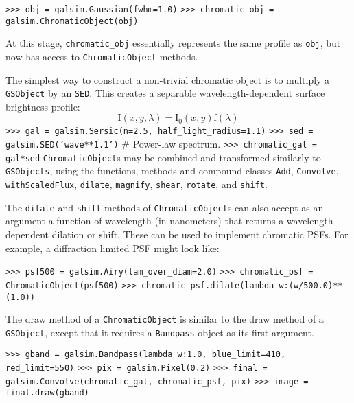 \documentclass[preprint,11pt]{../../devel/modules/aastex}
\begin{document}
{\tt >>> obj = galsim.Gaussian(fwhm=1.0)}\newline
{\tt >>> chromatic\_obj = galsim.ChromaticObject(obj)}

At this stage, \texttt{chromatic\_obj} essentially represents the same profile as \texttt{obj}, but
now has access to \texttt{ChromaticObject} methods.

The simplest way to construct a non-trivial chromatic object is to multiply a \texttt{GSObject} by
an \texttt{SED}.  This creates a separable wavelength-dependent surface brightness profile:
\begin{equation}
  \mathrm{I}(x, y, \lambda) = \mathrm{I}_0(x, y) \mathrm{f}(\lambda)
\end{equation}
\newline
{\tt >>> gal = galsim.Sersic(n=2.5, half\_light\_radius=1.1)}\newline
{\tt >>> sed = galsim.SED('wave**1.1')} \# Power-law spectrum. \newline
{\tt >>> chromatic\_gal = gal*sed}\newline
\newline
\texttt{ChromaticObject}s may be combined and transformed similarly to
\texttt{GSObjects}, using the functions, methods and compound classes \texttt{Add}, \texttt{Convolve}, \texttt{withScaledFlux}, \texttt{dilate}, \texttt{magnify}, \texttt{shear}, \texttt{rotate}, and \texttt{shift}.

The \texttt{dilate} and \texttt{shift} methods of
\texttt{ChromaticObject}s can also accept as an argument a function of wavelength (in nanometers)
that returns a wavelength-dependent dilation or shift.  These can be used to implement
chromatic PSFs.  For example, a diffraction limited PSF might look
like:

{\tt >>> psf500 = galsim.Airy(lam\_over\_diam=2.0)}\newline
{\tt >>> chromatic\_psf = ChromaticObject(psf500)}\newline
{\tt >>> chromatic\_psf.dilate(lambda w:(w/500.0)**(1.0))}

The draw method of a \texttt{ChromaticObject} is similar to the draw method of a \texttt{GSObject},
except that it requires a \texttt{Bandpass} object as its first
argument.

{\tt >>> gband = galsim.Bandpass(lambda w:1.0, blue\_limit=410, red\_limit=550)} \newline
{\tt >>> pix = galsim.Pixel(0.2)}\newline
{\tt >>> final = galsim.Convolve(chromatic\_gal, chromatic\_psf, pix)}\newline
{\tt >>> image = final.draw(gband)}\newline
\end{document}
